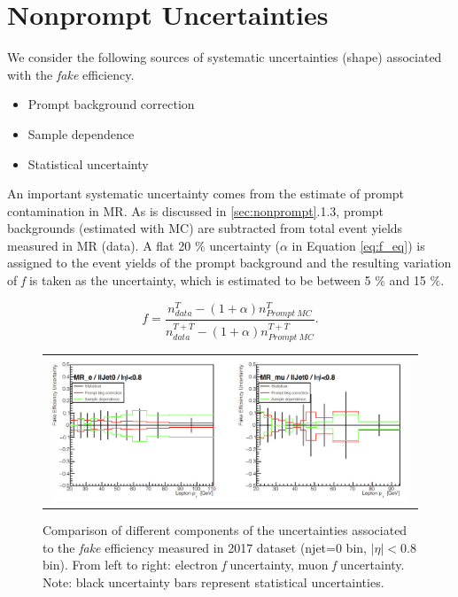 \section{Nonprompt Uncertainties}
\label{sec:NonUnc}

We consider the following sources of systematic uncertainties (shape) associated with the \emph{fake} efficiency.

\begin{itemize}
\item Prompt background correction
\item Sample dependence 
\item Statistical uncertainty 
\end{itemize}

An important systematic uncertainty comes from the estimate of prompt contamination in MR. As is discussed in \ref{sec:nonprompt}.1.3, prompt backgrounds (estimated with MC) are subtracted from total event yields measured in MR (data). A flat 20 $\%$ uncertainty ($\alpha$ in Equation \ref{eq:f_eq}) is assigned to the event yields of the prompt background and the resulting variation of \emph{f} is taken as the uncertainty, which is estimated to be between 5 $\%$ and 15 $\%$.

\begin{equation}
f=\frac{n_{data}^{T}-(1+\alpha)n_{Prompt~MC}^{T}}{n_{data}^{T+\overline{T}}-(1+\alpha)n_{Prompt~MC}^{T+\overline{T}}}.
\label{eq:f_eq}
\end{equation}  

\begin{figure}[tbh!]
 \begin{center}
 \begin{tabular}{c}
 \includegraphics[width=0.99\textwidth]{figures/Part3/Systematics/MR1}
 \end{tabular}
 \caption{Comparison of different components of the uncertainties associated to the \emph{fake} efficiency measured in 2017 dataset (njet=0 bin, $|\eta|<$0.8 bin). From left to right: electron \emph{f} uncertainty, muon \emph{f} uncertainty. Note: black uncertainty bars represent statistical uncertainties.}
 \label{fig:f_comp1}
 \end{center}
\end{figure}

